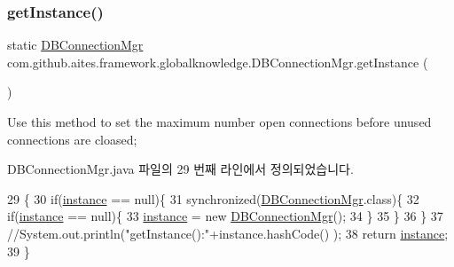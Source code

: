 \subsubsection{\texorpdfstring{get\+Instance()}{getInstance()}}
{\footnotesize\ttfamily static \mbox{\hyperlink{classcom_1_1github_1_1aites_1_1framework_1_1globalknowledge_1_1_d_b_connection_mgr}{D\+B\+Connection\+Mgr}} com.\+github.\+aites.\+framework.\+globalknowledge.\+D\+B\+Connection\+Mgr.\+get\+Instance (\begin{DoxyParamCaption}{ }\end{DoxyParamCaption})\hspace{0.3cm}{\ttfamily [static]}}



Use this method to set the maximum number open connections before unused connections are cloased; 



D\+B\+Connection\+Mgr.\+java 파일의 29 번째 라인에서 정의되었습니다.


\begin{DoxyCode}
29                                                    \{
30             \textcolor{keywordflow}{if}(\mbox{\hyperlink{classcom_1_1github_1_1aites_1_1framework_1_1globalknowledge_1_1_d_b_connection_mgr_a28a54b9f1a696f0e86227270d54f5d6e}{instance}} == null)\{
31                 \textcolor{keyword}{synchronized}(\mbox{\hyperlink{classcom_1_1github_1_1aites_1_1framework_1_1globalknowledge_1_1_d_b_connection_mgr_a12d4938d29b3a3f708adf3d34af899bd}{DBConnectionMgr}}.class)\{
32                         \textcolor{keywordflow}{if}(\mbox{\hyperlink{classcom_1_1github_1_1aites_1_1framework_1_1globalknowledge_1_1_d_b_connection_mgr_a28a54b9f1a696f0e86227270d54f5d6e}{instance}} == null)\{
33                             \mbox{\hyperlink{classcom_1_1github_1_1aites_1_1framework_1_1globalknowledge_1_1_d_b_connection_mgr_a28a54b9f1a696f0e86227270d54f5d6e}{instance}} = \textcolor{keyword}{new} \mbox{\hyperlink{classcom_1_1github_1_1aites_1_1framework_1_1globalknowledge_1_1_d_b_connection_mgr_a12d4938d29b3a3f708adf3d34af899bd}{DBConnectionMgr}}();
34                 \}
35             \}
36         \}
37         \textcolor{comment}{//System.out.println("getInstance():"+instance.hashCode() );}
38         \textcolor{keywordflow}{return} \mbox{\hyperlink{classcom_1_1github_1_1aites_1_1framework_1_1globalknowledge_1_1_d_b_connection_mgr_a28a54b9f1a696f0e86227270d54f5d6e}{instance}};
39     \}
\end{DoxyCode}
\mbox{\label{classcom_1_1github_1_1aites_1_1framework_1_1globalknowledge_1_1_d_b_connection_mgr_a67f3de21da7af6a9bae587a38eb18cb3}} 
